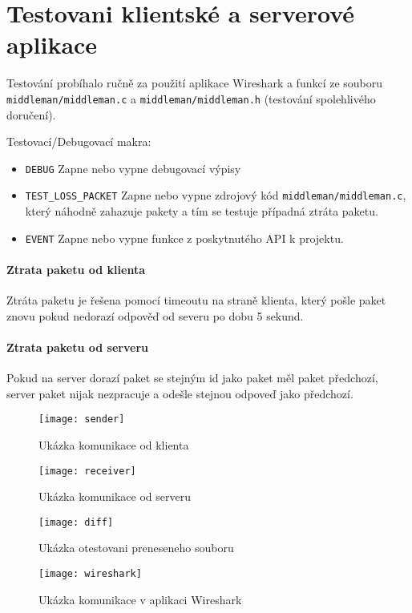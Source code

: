 \section{Testovani klientské a serverové aplikace}\label{sec:testovani}
Testování probíhalo ručně za použití aplikace Wireshark a funkcí
ze souboru \texttt{middleman/middleman.c} a \texttt{middleman/middleman.h}
(testování spolehlivého doručení).

Testovací/Debugovací makra:
\begin{itemize}
    \item \texttt{DEBUG} \- Zapne nebo vypne debugovací výpisy
    \item \texttt{TEST\_LOSS\_PACKET} \- Zapne nebo vypne zdrojový kód
    \texttt{middleman/middleman.c}, který náhodně zahazuje pakety
    a tím se testuje případná ztráta paketu.
    \item \texttt{EVENT} \- Zapne nebo vypne funkce z poskytnutého API k projektu.
\end{itemize}

\paragraph{Ztrata paketu od klienta}
Ztráta paketu je řešena pomocí timeoutu na straně klienta, který pošle
paket znovu pokud nedorazí odpověď od severu po dobu 5 sekund.

\paragraph{Ztrata paketu od serveru}
Pokud na server dorazí paket se stejným id jako paket měl
paket předchozí, server
paket nijak nezpracuje a odešle stejnou odpoveď jako předchozí.

\begin{figure}[H]
    \centering
    \texttt{[image: sender]}
    \caption{Ukázka komunikace od klienta}
    \label{fig:a1}
\end{figure}

\begin{figure}[H]
    \centering
    \texttt{[image: receiver]}
    \caption{Ukázka komunikace od serveru}
    \label{fig:a2}
\end{figure}

\begin{figure}[H]
    \centering
    \texttt{[image: diff]}
    \caption{Ukázka otestovani preneseneho souboru}
    \label{fig:a4}
\end{figure}

\begin{figure}[H]
    \centering
    \texttt{[image: wireshark]}
    \caption{Ukázka komunikace v aplikaci Wireshark}
    \label{fig:a5}
\end{figure}
